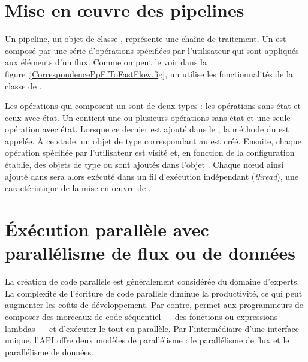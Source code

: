 


\section{Mise en \oe{}uvre des pipelines}

Un pipeline, un objet de classe , repr\'esente une cha\^ine de traitement. Un  est compos\'e par une s\'erie d'op\'erations sp\'ecifi\'ees par l'utilisateur qui sont appliqu\'es aux \'el\'ements d'un flux. Comme on peut le voir dans la figure~\ref{CorrespondencePpFfToFastFlow.fig}, un  utilise les fonctionnalit\'es de la classe  de . 

Les op\'erations qui composent un  sont de deux types : les op\'erations sans \'etat et ceux avec \'etat. Un  contient une ou plusieurs op\'erations sans \'etat et une seule op\'eration avec \'etat. Lorsque ce dernier est ajout\'e dans le , la m\'ethode  du  est appel\'ee. \`A ce stade, un objet de type  correspondant au  est cr\'e\'e. Ensuite, chaque op\'eration sp\'ecifi\'ee par l'utilisateur est visit\'e et, en fonction de la configuration \'etablie, des objets de type  ou  sont ajout\'es dans l'objet . Chaque nœud ainsi ajout\'e dans  sera alors ex\'ecut\'e dans un fil d'ex\'ecution ind\'ependant (\emph{thread}), une caract\'eristique de la mise en \oe{}uvre de .


\section{\'Ex\'ecution parall\`ele avec parall\'elisme de flux ou de donn\'ees}

La cr\'eation de code parall\`ele est g\'en\'eralement consid\'er\'ee du domaine d'experts. La complexit\'e de l'\'ecriture de code parall\`ele diminue la productivit\'e, ce qui peut augmenter les co\^uts de d\'eveloppement. Par contre,  permet aux programmeurs de composer des morceaux de code s\'equentiel --- des fonctions ou expressions lambdas --- et d'ex\'ecuter le tout en parall\`ele. Par l'interm\'ediaire d'une interface unique, l'API offre deux mod\`eles de parall\'elisme : le parall\'elisme de flux et le parall\'elisme de donn\'ees.


